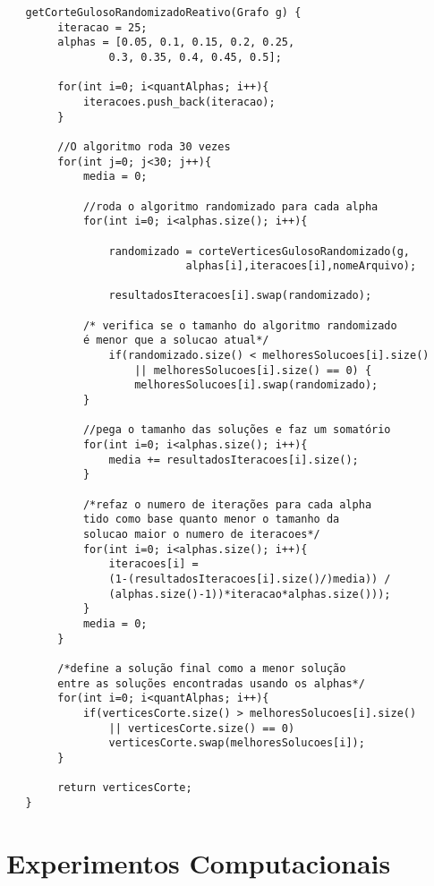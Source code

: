 \documentclass[a4paper, 12pt]{article}
\begin{document}
\begin{lstlisting} 
   getCorteGulosoRandomizadoReativo(Grafo g) {
        iteracao = 25;
        alphas = [0.05, 0.1, 0.15, 0.2, 0.25, 
                0.3, 0.35, 0.4, 0.45, 0.5];
        
        for(int i=0; i<quantAlphas; i++){
            iteracoes.push_back(iteracao);
        }
    
        //O algoritmo roda 30 vezes
        for(int j=0; j<30; j++){
            media = 0;
        
            //roda o algoritmo randomizado para cada alpha
            for(int i=0; i<alphas.size(); i++){
            
                randomizado = corteVerticesGulosoRandomizado(g,
                            alphas[i],iteracoes[i],nomeArquivo);
            
                resultadosIteracoes[i].swap(randomizado);
            
            /* verifica se o tamanho do algoritmo randomizado
            é menor que a solucao atual*/
                if(randomizado.size() < melhoresSolucoes[i].size()
                    || melhoresSolucoes[i].size() == 0) {
                    melhoresSolucoes[i].swap(randomizado);
            }
        
            //pega o tamanho das soluções e faz um somatório
            for(int i=0; i<alphas.size(); i++){
                media += resultadosIteracoes[i].size();
            }
        
            /*refaz o numero de iterações para cada alpha
            tido como base quanto menor o tamanho da
            solucao maior o numero de iteracoes*/
            for(int i=0; i<alphas.size(); i++){
                iteracoes[i] =  
                (1-(resultadosIteracoes[i].size()/)media)) / 
                (alphas.size()-1))*iteracao*alphas.size()));
            }
            media = 0;
        }
    
        /*define a solução final como a menor solução
        entre as soluções encontradas usando os alphas*/
        for(int i=0; i<quantAlphas; i++){
            if(verticesCorte.size() > melhoresSolucoes[i].size()
                || verticesCorte.size() == 0)
                verticesCorte.swap(melhoresSolucoes[i]);
        }
        
        return verticesCorte;
   }
 \end{lstlisting}

\section{Experimentos Computacionais}
\end{document}
